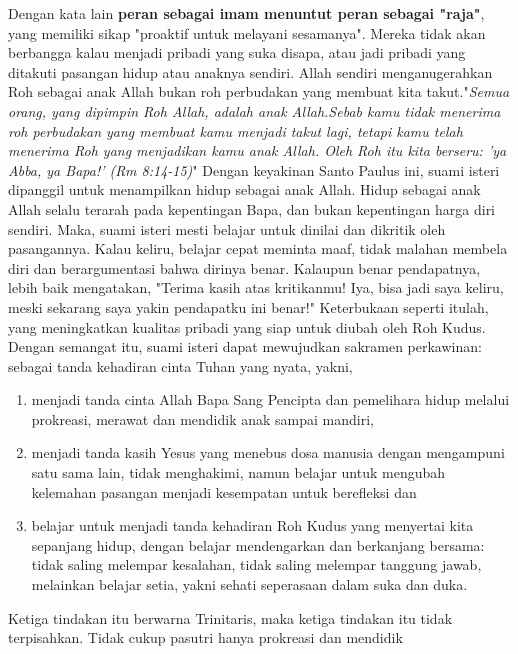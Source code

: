     Dengan kata lain \textbf{peran sebagai imam menuntut peran sebagai "raja"},
    yang memiliki sikap "proaktif untuk melayani sesamanya". Mereka
    tidak akan berbangga kalau menjadi pribadi yang suka disapa, atau
    jadi pribadi yang ditakuti pasangan hidup atau anaknya sendiri. 
    Allah sendiri menganugerahkan Roh sebagai anak Allah bukan roh
    perbudakan yang membuat kita takut."\textit{Semua orang, yang dipimpin Roh
    Allah, adalah anak Allah.Sebab kamu tidak menerima roh perbudakan
    yang membuat kamu menjadi takut lagi, tetapi kamu telah menerima Roh
    yang menjadikan kamu anak Allah. Oleh Roh itu kita berseru: 'ya
    Abba, ya Bapa!' (Rm 8:14-15)}"  Dengan keyakinan Santo Paulus ini,
    suami isteri dipanggil untuk menampilkan hidup sebagai anak Allah.
    Hidup sebagai anak Allah selalu terarah pada kepentingan Bapa, dan
    bukan kepentingan harga diri sendiri. Maka, suami isteri mesti
    belajar untuk dinilai dan dikritik oleh pasangannya. Kalau keliru,
    belajar cepat meminta maaf, tidak malahan membela diri dan
    berargumentasi bahwa dirinya benar. Kalaupun benar pendapatnya,
    lebih baik mengatakan, "Terima kasih atas kritikanmu! Iya, bisa jadi
    saya keliru, meski sekarang saya yakin pendapatku ini benar!"
    Keterbukaan seperti itulah, yang meningkatkan kualitas pribadi yang
    siap untuk diubah oleh Roh Kudus.  Dengan semangat itu, suami isteri
    dapat mewujudkan sakramen perkawinan: sebagai tanda kehadiran cinta
    Tuhan yang nyata, yakni,
\small
\begin{enumerate}[label=(\roman*) ]
\item menjadi tanda cinta Allah Bapa Sang Pencipta dan pemelihara
    hidup melalui prokreasi, merawat dan mendidik anak sampai mandiri,

\item menjadi tanda kasih Yesus yang menebus dosa manusia dengan
    mengampuni satu sama lain, tidak menghakimi, namun belajar untuk
    mengubah kelemahan pasangan menjadi kesempatan untuk berefleksi dan

\item belajar untuk menjadi tanda kehadiran Roh Kudus yang menyertai
    kita sepanjang hidup, dengan belajar mendengarkan dan berkanjang
    bersama: tidak saling melempar kesalahan, tidak saling melempar
    tanggung jawab, melainkan belajar setia, yakni sehati seperasaan
    dalam suka dan duka.
\end{enumerate}
\normalsize
    Ketiga tindakan itu berwarna Trinitaris, maka ketiga tindakan itu
    tidak terpisahkan. Tidak cukup pasutri hanya prokreasi dan mendidik
